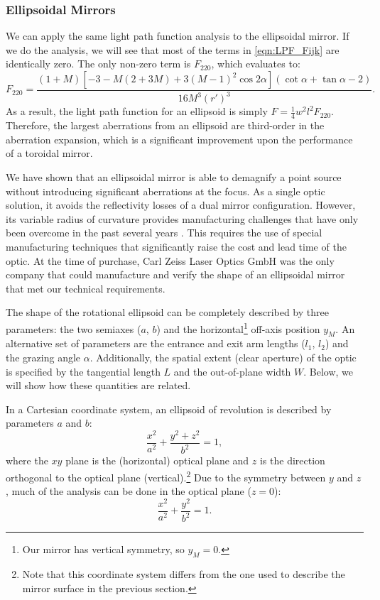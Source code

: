 \subsubsection{Ellipsoidal Mirrors}

We can apply the same light path function analysis to the ellipsoidal mirror. If we do the analysis, we will see that most of the terms in \cref{eqn:LPF_Fijk} are identically zero. The only non-zero term is $F_{220}$, which evaluates to:
\begin{equation}
F_{220} = \frac{(1+M) \left[-3-M(2+3M)+3(M-1)^2 \cos 2 \alpha \right] (\cot \alpha + \tan \alpha -2)}{16 M^3 (r')^3}.
\end{equation}
As a result, the light path function for an ellipsoid is simply $F = \frac{1}{4} w^2 l^2 F_{220}$. Therefore, the largest aberrations from an ellipsoid are third-order in the aberration expansion, which is a significant improvement upon the performance of a toroidal mirror.

We have shown that an ellipsoidal mirror is able to demagnify a point source without introducing significant aberrations at the focus. As a single optic solution, it avoids the reflectivity losses of a dual mirror configuration. However, its variable radius of curvature provides manufacturing challenges that have only been overcome in the past several years \cite{motoyamaErrorAnalysisEllipsoidal2014}. This requires the use of special manufacturing techniques that significantly raise the cost and lead time of the optic. At the time of purchase, Carl Zeiss Laser Optics GmbH was the only company that could manufacture and verify the shape of an ellipsoidal mirror that met our technical requirements.

The shape of the rotational ellipsoid can be completely described by three parameters: the two semiaxes ($a$, $b$) and the horizontal\footnote{Our mirror has vertical symmetry, so $y_M=0$.} off-axis position $y_M$. An alternative set of parameters are the entrance and exit arm lengths ($l_1$, $l_2$) and the grazing angle $\alpha$. Additionally, the spatial extent (clear aperture) of the optic is specified by the tangential length $L$ and the out-of-plane width $W$. Below, we will show how these quantities are related.

In a Cartesian coordinate system, an ellipsoid of revolution is described by parameters $a$ and $b$:
\begin{equation}
\frac{x^2}{a^2} + \frac{y^2 + z^2}{b^2} = 1,
\end{equation}
where the $xy$ plane is the (horizontal) optical plane and $z$ is the direction orthogonal to the optical plane (vertical).\footnote{Note that this coordinate system differs from the one used to describe the mirror surface in the previous section.} Due to the symmetry between $y$ and $z$, much of the analysis can be done in the optical plane ($z=0$):
\begin{equation}
\frac{x^2}{a^2} + \frac{y^2}{b^2} = 1.
\label{eqn:ellipse}
\end{equation}

